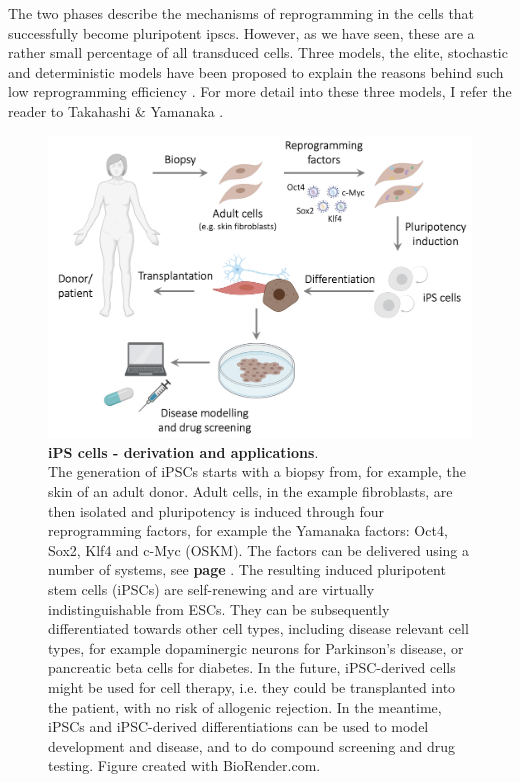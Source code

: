 The two phases describe the mechanisms of reprogramming in the cells that successfully become pluripotent \glspl{ipsc}.
However, as we have seen, these are a rather small percentage of all transduced cells.
Three models, the elite, stochastic and deterministic models have been proposed to explain the reasons behind such low reprogramming efficiency \cite{omole2018ten}.
For more detail into these three models, I refer the reader to Takahashi \& Yamanaka \cite{takahashi2016decade}.

\begin{figure}[htbp]
\centering
\includegraphics[width=14cm]{Chapter1/Fig/ipscs.png}
\caption[iPS cells]{\textbf{iPS cells - derivation and applications}.\\
The generation of iPSCs starts with a biopsy from, for example, the skin of an adult donor.
Adult cells, in the example fibroblasts, are then isolated and pluripotency is induced through four reprogramming factors, for example the Yamanaka factors: Oct4, Sox2, Klf4 and c-Myc (OSKM).
The factors can be delivered using a number of systems, see \textbf{page \pageref{sec:ipsc_delivery}}.
The resulting induced pluripotent stem cells (iPSCs) are self-renewing and are virtually indistinguishable from ESCs.
They can be subsequently differentiated towards other cell types, including disease relevant cell types, for example dopaminergic neurons for Parkinson's disease, or pancreatic beta cells for diabetes.
In the future, iPSC-derived cells might be used for cell therapy, i.e. they could be transplanted into the patient, with no risk of allogenic rejection.
In the meantime, iPSCs and iPSC-derived differentiations can be used to model development and disease, and to do compound screening and drug testing.
Figure created with BioRender.com.}
\label{fig:ipsc}
\end{figure}


